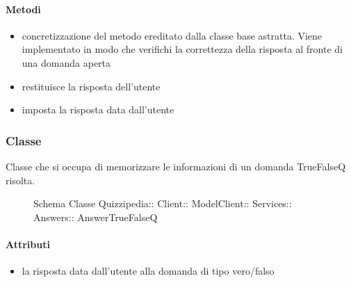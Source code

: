 \paragraph{Metodi}
\begin{itemize}
\item {}
\newline
concretizzazione del metodo ereditato dalla classe base astratta. Viene implementato in modo che verifichi la correttezza della risposta al fronte di una domanda aperta
\newline
\item {}
\newline
restituisce la risposta dell'utente
\newline
\item {}
\newline
imposta la risposta data dall'utente
\newline
\end{itemize}
\subsubsection{Classe }
Classe che si occupa di memorizzare le informazioni di un domanda TrueFalseQ risolta.
\begin{figure}[H]
\centering
\noindent{}
\caption[Schema Classe AnswerTrueFalseQ]{Schema Classe Quizzipedia:: Client:: ModelClient:: Services:: Answers:: AnswerTrueFalseQ}
\end{figure}
\paragraph{Attributi}
\begin{itemize}
\item {}
\newline
la risposta data dall'utente alla domanda di tipo vero/falso
\end{itemize}
